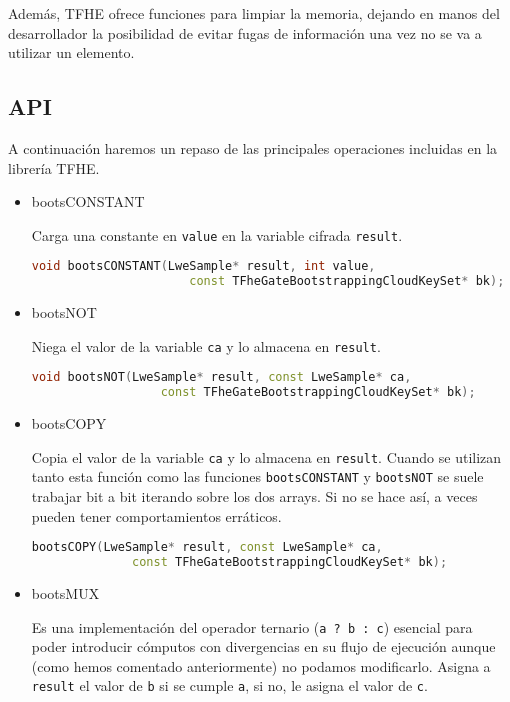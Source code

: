Además, TFHE ofrece funciones para limpiar la memoria, dejando en manos del desarrollador la posibilidad de evitar fugas de información una vez no se va a utilizar un elemento.

\subsection{API}

A continuación haremos un repaso de las principales operaciones incluidas en la librería TFHE.

\begin{itemize}

  \item bootsCONSTANT

  Carga una constante en \verb|value| en la variable cifrada \verb|result|.

  \begin{lstlisting}[language=c++]
    void bootsCONSTANT(LweSample* result, int value,
                      const TFheGateBootstrappingCloudKeySet* bk);
  \end{lstlisting}

  \item bootsNOT

  Niega el valor de la variable \verb|ca| y lo almacena en \verb|result|.

  \begin{lstlisting}[language=c++]
    void bootsNOT(LweSample* result, const LweSample* ca,
                  const TFheGateBootstrappingCloudKeySet* bk);
  \end{lstlisting}

  \item bootsCOPY

  Copia el valor de la variable \verb|ca| y lo almacena en \verb|result|. Cuando se utilizan tanto esta función como las funciones \verb|bootsCONSTANT|  y \verb|bootsNOT| se suele trabajar bit a bit iterando sobre los dos arrays. Si no se hace así, a veces pueden tener comportamientos erráticos.

  \begin{lstlisting}[language=c++]
    bootsCOPY(LweSample* result, const LweSample* ca,
              const TFheGateBootstrappingCloudKeySet* bk);
  \end{lstlisting}

  \item bootsMUX

  Es una implementación del operador ternario (\verb|a ? b : c|) esencial para poder introducir cómputos con divergencias en su flujo de ejecución aunque (como hemos comentado anteriormente) no podamos modificarlo. Asigna a \verb|result| el valor de \verb|b| si se cumple \verb|a|, si no, le asigna el valor de \verb|c|.


\end{itemize}
